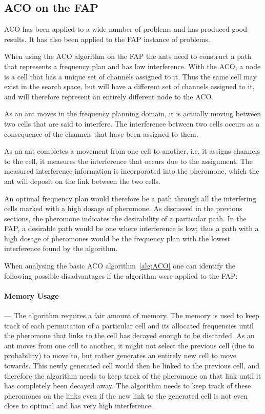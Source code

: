\subsection{ACO on the FAP}
ACO has been applied to a wide number of problems and has produced good results. It has also been applied to the FAP instance of problems.

When using the ACO algorithm on the FAP the ants need to construct a path that represents a frequency plan and has low interference. With the ACO, a node is a cell that has a unique set of channels assigned to it. Thus the same cell may exist in the search space, but will have a different set of channels assigned to it, and will therefore represent an entirely different node to the ACO.

As an ant moves in the frequency planning domain, it is actually moving between two cells that are said to interfere. The interference between two cells occurs as a consequence of the channels that have been assigned to them. 

As an ant completes a movement from one cell to another, i.e. it assigns channels to the cell, it measures the interference that occurs due to the assignment.  The measured interference information is incorporated into the pheromone, which the ant will deposit on the link between the two cells.

An optimal frequency plan would therefore be a path through all the interfering cells marked with a high dosage of pheromone. As discussed in the previous sections, the pheromone indicates the desirability of a particular path. In the FAP, a desirable path would be one where interference is low; thus a path with a high dosage of pheromones would be the frequency plan with the lowest interference found by the algorithm.

When analysing the basic ACO algorithm~\ref{alg:ACO} one can identify the following possible disadvantages if the algorithm were applied to the FAP:
\paragraph{Memory Usage}
--- The algorithm requires a fair amount of memory. The memory is used to keep track of each permutation of a particular cell and its allocated frequencies until the pheromone that links to the cell has decayed enough to be discarded. As an ant moves from one cell to another, it might not select the previous cell (due to probability) to move to, but rather generates an entirely new cell to move towards. This newly generated cell would then be linked to the previous cell, and therefore the algorithm needs to keep track of the pheromone on that link until it has completely been decayed away. The algorithm needs to keep track of these pheromones on the links even if the new link to the generated cell is not even close to optimal and has very high interference.
